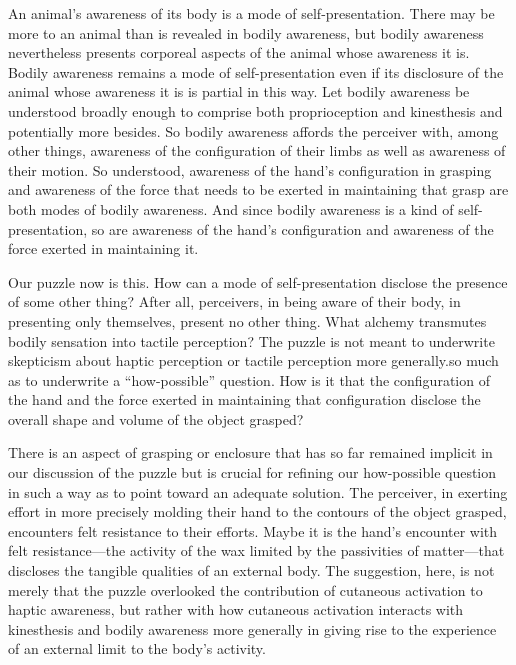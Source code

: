\documentclass[12pt]{article}
\begin{document}
An animal's awareness of its body is a mode of self-presentation. There may be more to an animal than is revealed in bodily awareness, but bodily awareness nevertheless presents corporeal aspects of the animal whose awareness it is. Bodily awareness remains a mode of self-presentation even if its disclosure of the animal whose awareness it is is partial in this way. Let bodily awareness be understood broadly enough to comprise both proprioception and kinesthesis and potentially more besides. So bodily awareness affords the perceiver with, among other things, awareness of the configuration of their limbs as well as awareness of their motion. So understood, awareness of the hand's configuration in grasping and awareness of the force that needs to be exerted in maintaining that grasp are both modes of bodily awareness. And since bodily awareness is a kind of self-presentation, so are awareness of the hand's configuration and awareness of the force exerted in maintaining it. 

Our puzzle now is this. How can a mode of self-presentation disclose the presence of some other thing? After all, perceivers, in being aware of their body, in presenting only themselves, present no other thing. What alchemy transmutes bodily sensation into tactile perception? The puzzle is not meant to underwrite skepticism about haptic perception or tactile perception more generally.so much as to underwrite a ``how-possible'' question. How is it that the configuration of the hand and the force exerted in maintaining that configuration disclose the overall shape and volume of the object grasped?

There is an aspect of grasping or enclosure that has so far remained implicit in our discussion of the puzzle but is crucial for refining our how-possible question in such a way as to point toward an adequate solution. The perceiver, in exerting effort in more precisely molding their hand to the contours of the object grasped, encounters felt resistance to their efforts. Maybe it is the hand's encounter with felt resistance---the activity of the wax limited by the passivities of matter---that discloses the tangible qualities of an external body. The suggestion, here, is not merely that the puzzle overlooked the contribution of cutaneous activation to haptic awareness, but rather with how cutaneous activation interacts with kinesthesis and bodily awareness more generally in giving rise to the experience of an external limit to the body's activity.
\end{document}
